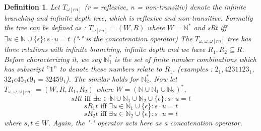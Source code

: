 \documentclass[12pt, a4paper]{scrartcl}
\newtheorem{definition}{Definition}[subsection]
\begin{document}
\begin{definition}
    Let $T_{\omega [rn]}$ (r = reflexive, n = non-transitiv) denote the infinite branching and infinite depth tree, which is reflexive and non-transitive.
    Formally the tree can be defined as : $T_{\omega [rn]} = (W, R)$ where $W = \mathbb{N}^*$ and sRt iff $\exists u \in \mathbb{N} \cup \{\epsilon\} : s \cdot u = t$ ("$\cdot$" is the concatenation operator) \newline \newline
    The $T_{\omega,\omega,\omega [rn]}$ tree has three relations with infinite branching, infinite depth and we have $R_1,R_2 \subseteq R$. Before characterizing it, we say
    $\mathbb{N}_{1}^*$ is the set of finite number combinations which has subscript $"1"$ to denote these numbers relate to $R_1$.  \newline 
    (examples : $2_{1}, 4231123_{1}$, $32_{1} \epsilon 45_{1} \epsilon 9_{1} = 32459_{1}$). The similar holds for $\mathbb{N}_2^*$.\newline \newline
    Now let $T_{\omega,\omega,\omega [rn]} = (W, R, R_1, R_2 )$ where $W = (\mathbb{N} \cup \mathbb{N}_{1} \cup \mathbb{N}_{2})^*$, 
    $$sRt \mbox{ iff } \exists u \in \mathbb{N} \cup \mathbb{N}_{1} \cup \mathbb{N}_{2} \cup \{\epsilon\} : s \cdot u = t$$
    $$sR_1t \mbox { iff } \exists u \in \mathbb{N}_{1} \cup \{\epsilon\} : s \cdot u = t$$
    $$sR_2t \mbox { iff } \exists u \in \mathbb{N}_{2} \cup \{\epsilon\} : s \cdot u = t$$
    where $s,t \in W$. Again, the "$\cdot$" operator acts here as a concatenation operator.

    \begin{figure}[h]
\centering
{}
\end{figure}
\end{definition}
\end{document}
